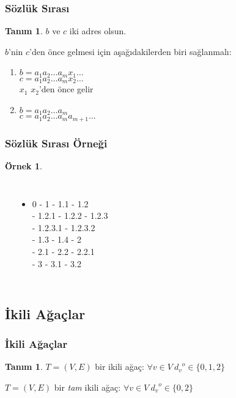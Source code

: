 \documentclass[dvipsnames]{beamer}
\theoremstyle{definition}
\newtheorem{tanim}[theorem]{Tanım}
\theoremstyle{example}
\newtheorem{ornek}[theorem]{Örnek}
\theoremstyle{plain}
\begin{document}
\begin{frame}
  \frametitle{Sözlük Sırası}

  \begin{tanim}
    $b$ ve $c$ iki adres olsun.

    $b$'nin $c$'den önce gelmesi için aşağıdakilerden biri sağlanmalı:
    \begin{enumerate}
      \item $b=a_1 a_2 \ldots a_m x_1 \ldots$\\
        $c=a_1 a_2 \ldots a_m x_2 \ldots$\\
        $x_1$ $x_2$'den önce gelir
      \pause
      \item $b=a_1 a_2 \ldots a_m$\\
        $c=a_1 a_2 \ldots a_m a_{m+1} \ldots$
    \end{enumerate}
  \end{tanim}
\end{frame}

\begin{frame}
  \frametitle{Sözlük Sırası Örneği}

  \begin{ornek}
    \begin{columns}
      \begin{center}
      \end{center}

      \begin{itemize}
        \item 0 - 1 - 1.1 - 1.2\\
          - 1.2.1 - 1.2.2 - 1.2.3\\
          - 1.2.3.1 - 1.2.3.2\\
          - 1.3 - 1.4 - 2\\
          - 2.1 - 2.2 - 2.2.1\\
          - 3 - 3.1 - 3.2
      \end{itemize}
    \end{columns}
  \end{ornek}
\end{frame}

\subsection{İkili Ağaçlar}

\begin{frame}
  \frametitle{İkili Ağaçlar}

  \begin{tanim}
    $T=(V,E)$ bir \alert{ikili ağaç}: $\forall v \in V~{d_v}^o \in \{0,1,2\}$

    \bigskip
    $T=(V,E)$ bir \emph{tam} ikili ağaç:
      $\forall v \in V~{d_v}^o \in \{0,2\}$
  \end{tanim}
\end{frame}
\end{document}
